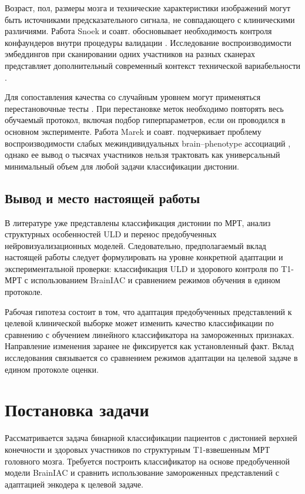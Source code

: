 \documentclass[11pt,a4paper]{article}
\begin{document}
Возраст, пол, размеры мозга и технические характеристики изображений могут быть источниками предсказательного сигнала, не совпадающего с клиническими различиями. Работа Snoek и соавт. обосновывает необходимость контроля конфаундеров внутри процедуры валидации \cite{ref23}. Исследование воспроизводимости эмбеддингов при сканировании одних участников на разных сканерах представляет дополнительный современный контекст технической вариабельности \cite{ref28}.

Для сопоставления качества со случайным уровнем могут применяться перестановочные тесты \cite{ref25}. При перестановке меток необходимо повторять весь обучаемый протокол, включая подбор гиперпараметров, если он проводился в основном эксперименте. Работа Marek и соавт. подчеркивает проблему воспроизводимости слабых межиндивидуальных brain–phenotype ассоциаций \cite{ref26}, однако ее вывод о тысячах участников нельзя трактовать как универсальный минимальный объем для любой задачи классификации дистонии.

\subsection{Вывод и место настоящей работы}

В литературе уже представлены классификация дистонии по МРТ, анализ структурных особенностей ULD и перенос предобученных нейровизуализационных моделей. Следовательно, предполагаемый вклад настоящей работы следует формулировать на уровне конкретной адаптации и экспериментальной проверки: классификация ULD и здорового контроля по T1-МРТ с использованием BrainIAC и сравнением режимов обучения в едином протоколе.

Рабочая гипотеза состоит в том, что адаптация предобученных представлений к целевой клинической выборке может изменить качество классификации по сравнению с обучением линейного классификатора на замороженных признаках. Направление изменения заранее не фиксируется как установленный факт. Вклад исследования связывается со сравнением режимов адаптации на целевой задаче в едином протоколе оценки.

\section{Постановка задачи}

Рассматривается задача бинарной классификации пациентов с дистонией верхней конечности и здоровых участников по структурным T1-взвешенным МРТ головного мозга. Требуется построить классификатор на основе предобученной модели BrainIAC и сравнить использование замороженных представлений с адаптацией энкодера к целевой задаче.
\end{document}
